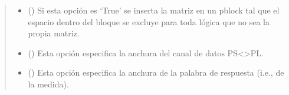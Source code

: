 \documentclass[letterpaper,10pt,english]{sphinxmanual}
\begin{document}
\begin{fulllineitems}
\begin{fulllineitems}
\begin{quote}
\begin{description}
\begin{itemize}
\item {} 
\sphinxAtStartPar
{} (\sphinxstyleliteralemphasis{\sphinxupquote{, }}) \textendash{} Si esta opción es ‘True’ se inserta la matriz en un pblock tal que el espacio dentro del bloque se excluye para toda lógica que no sea la propia matriz.

\item {} 
\sphinxAtStartPar
{} (\sphinxstyleliteralemphasis{\sphinxupquote{, }}) \textendash{} Esta opción especifica la anchura del canal de datos PS\textless{}\textendash{}\textgreater{}PL.

\item {} 
\sphinxAtStartPar
{} (\sphinxstyleliteralemphasis{\sphinxupquote{, }}) \textendash{} Esta opción especifica la anchura de la palabra de respuesta (i.e., de la medida).

\end{itemize}

\end{description}\end{quote}

\end{fulllineitems}



\end{fulllineitems}
\end{document}
